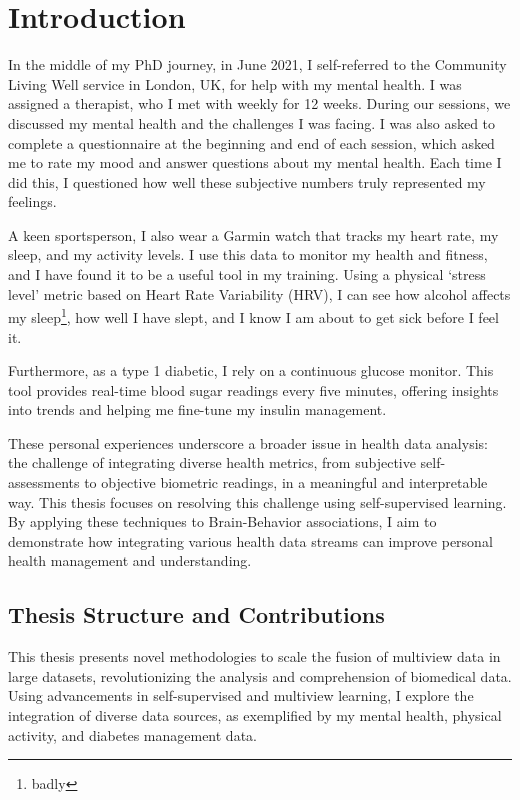 \graphicspath{{chapters/introduction/}}


\chapter{Introduction}\label{chap:introduction}

In the middle of my PhD journey, in June 2021, I self-referred to the Community Living Well service in London, UK, for help with my mental health.
I was assigned a therapist, who I met with weekly for 12 weeks.
During our sessions, we discussed my mental health and the challenges I was facing.
I was also asked to complete a questionnaire at the beginning and end of each session, which asked me to rate my mood and answer questions about my mental health.
Each time I did this, I questioned how well these subjective numbers truly represented my feelings.

A keen sportsperson, I also wear a Garmin watch that tracks my heart rate, my sleep, and my activity levels.
I use this data to monitor my health and fitness, and I have found it to be a useful tool in my training.
Using a physical `stress level' metric based on Heart Rate Variability (HRV), I can see how alcohol affects my sleep\footnote{badly}, how well I have slept, and I know I am about to get sick before I feel it.

Furthermore, as a type 1 diabetic, I rely on a continuous glucose monitor.
This tool provides real-time blood sugar readings every five minutes, offering insights into trends and helping me fine-tune my insulin management.

These personal experiences underscore a broader issue in health data analysis: the challenge of integrating diverse health metrics, from subjective self-assessments to objective biometric readings, in a meaningful and interpretable way.
This thesis focuses on resolving this challenge using self-supervised learning.
By applying these techniques to Brain-Behavior associations, I aim to demonstrate how integrating various health data streams can improve personal health management and understanding.


\section{Thesis Structure and Contributions}


This thesis presents novel methodologies to scale the fusion of multiview data in large datasets, revolutionizing the analysis and comprehension of biomedical data.
Using advancements in self-supervised and multiview learning, I explore the integration of diverse data sources, as exemplified by my mental health, physical activity, and diabetes management data.

